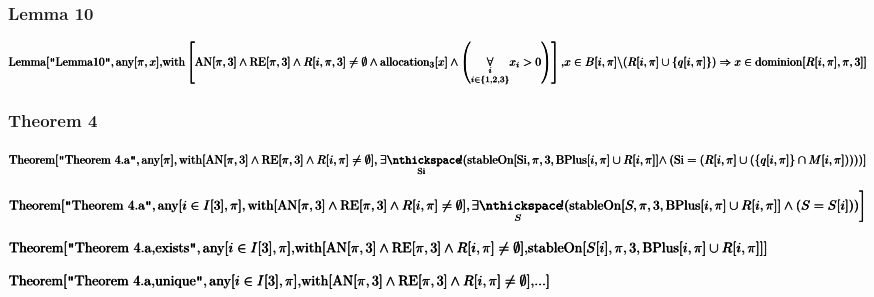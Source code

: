 \documentclass{article}
\begin{document}
\subsubsection*{Lemma 10}

\noindent\(\pmb{\text{Lemma}[\text{$\texttt{"}$Lemma10$\texttt{"}$},\text{any}[\pi ,x],}\\
\pmb{\text{with}\left[\text{AN}[\pi ,3]\land \text{RE}[\pi ,3]\land R[i,\pi ,3]\neq \emptyset \land \text{allocation}_3[x]\land \left(\underset{i\in
\{1,2,3\}}{\underset{i}{\forall }}x_i>0\right)\right],}\\
\pmb{x\in B[i,\pi ]\backslash (R[i,\pi ]\cup \{q[i,\pi ]\}) \Rightarrow  x\in \text{dominion}[R[i,\pi ],\pi ,3]]}\)

\subsubsection*{Theorem 4}

\noindent\(\pmb{\text{Theorem}[\text{$\texttt{"}$Theorem 4.a$\texttt{"}$}, \text{any}[\pi ],\text{with}[\text{AN}[\pi ,3]\land \text{RE}[\pi ,3]\land
R[i,\pi ]\neq \emptyset ],}\\
\pmb{\underset{\text{Si}}{\exists \nthickspace \! !}(\text{stableOn}[\text{Si},\pi ,3,\text{BPlus}[i,\pi ]\cup R[i,\pi ]] \land  }\\
\pmb{(\text{Si}=(R[i,\pi ]\cup (\{q[i,\pi ]\}\cap M[i,\pi ]))))]}\)

\noindent\(\pmb{\text{Theorem}[\text{$\texttt{"}$Theorem 4.a$\texttt{"}$}, \text{any}[i\in I[3],\pi ],\text{with}[\text{AN}[\pi ,3]\land \text{RE}[\pi
,3]\land R[i,\pi ]\neq \emptyset ],}\\
\pmb{\left.\underset{S}{\exists \nthickspace \! !}(\text{stableOn}[S,\pi ,3,\text{BPlus}[i,\pi ]\cup R[i,\pi ]] \land  (S=S[i]))\right]}\)

\noindent\(\pmb{\text{Theorem}[\text{$\texttt{"}$Theorem 4.a,exists$\texttt{"}$}, \text{any}[i\in I[3],\pi ],}\\
\pmb{\text{with}[\text{AN}[\pi ,3]\land \text{RE}[\pi ,3]\land R[i,\pi ]\neq \emptyset ],}\\
\pmb{\text{stableOn}[S[i],\pi ,3,\text{BPlus}[i,\pi ]\cup R[i,\pi ]] ]}\)

\noindent\(\pmb{\text{Theorem}[\text{$\texttt{"}$Theorem 4.a,unique$\texttt{"}$}, \text{any}[i\in I[3],\pi ],}\\
\pmb{\text{with}[\text{AN}[\pi ,3]\land \text{RE}[\pi ,3]\land R[i,\pi ]\neq \emptyset ],}\\
\pmb{\text{...} ]}\)
\end{document}
